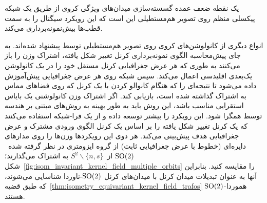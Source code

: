 یک نقطه ضعف عمده گسسته‌سازی میدان‌های ویژگی کروی از طریق یک شبکه پیکسلی منظم روی تصویر هم‌مستطیلی این است که این رویکرد سیگنال را به سمت قطب‌ها بیش‌نمونه‌برداری می‌کند.


انواع دیگری از کانولوشن‌های کروی روی تصویر هم‌مستطیلی توسط \citet{su2017spherical,su2019kernel} پیشنهاد شده‌اند.
به جای پیش‌محاسبه الگوی نمونه‌برداری کرنل تغییر شکل یافته، \citet{su2017spherical} اشتراک وزن را باز می‌کنند به طوری که هر عرض جغرافیایی کرنل مستقل خود را در یک کانولوشن یک‌بعدی اقلیدسی اعمال می‌کند.
سپس شبکه روی هر عرض جغرافیایی پیش‌آموزش داده می‌شود تا نتیجه‌ای را که هنگام کانوالو کردن با یک کرنل که روی فضاهای مماس به اشتراک گذاشته شده است، بازیابی کند.
اگر اشتراک وزن کانولوشنی یک بایاس استقرایی مناسب باشد، این روش باید به طور بهینه به روش‌های مبتنی بر هندسه توسط \citet{zhao2018distortion,tateno2018distortion} همگرا شود.
\citet{su2019kernel} این رویکرد را بیشتر توسعه داده و از یک فرا-شبکه استفاده می‌کنند که یک کرنل تغییر شکل یافته را بر اساس یک کرنل الگوی ورودی مشترک و عرض جغرافیایی هدف پیش‌بینی می‌کند.
هر دوی این رویکردها وزن‌ها را روی مدارهای دایره‌ای (خطوط با عرض جغرافیایی ثابت) از گروه ایزومتری در نظر گرفته شده~$\operatorname{SO}(2)$ از~$S^2 \backslash \{n,s\}$ به اشتراک می‌گذارند؛ شکل~\ref{fig:isom_invariant_kernel_field_multiple_orbits} را مقایسه کنید.
بنابراین آنها به عنوان تبدیلات میدان کرنل با میدان‌های کرنل $\operatorname{SO}(2)$-ناوردا شناسایی می‌شوند، که طبق قضیه~\ref{thm:isometry_equivariant_kernel_field_trafos} $\operatorname{SO}(2)$-هموردا هستند.



